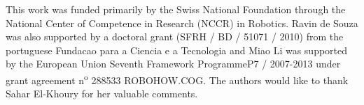 







\begin{acknowledgements}
This work was funded primarily by the Swiss National Foundation through the National Center of Competence in Research (NCCR) in Robotics. Ravin de Souza was also supported by a doctoral grant (SFRH / BD / 51071 / 2010) from the portuguese Fundacao para a Ciencia e a Tecnologia and Miao Li was supported by the European Union Seventh Framework ProgrammeP7 / 2007-2013 under grant agreement n\textsuperscript o 288533 ROBOHOW.COG.
The authors would like to thank Sahar El-Khoury for her valuable comments.
\end{acknowledgements}








